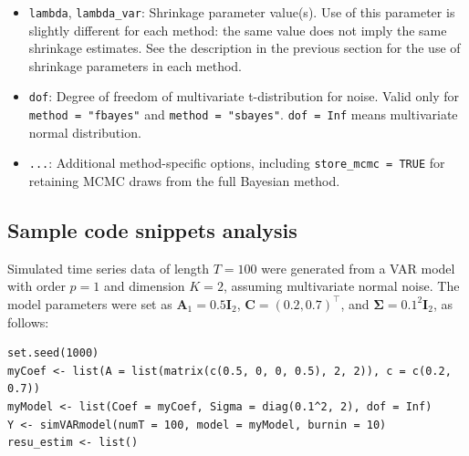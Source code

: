 \begin{itemize}
  \begin{enumerate}
  \def\labelenumi{\arabic{enumi}.}
  \tightlist
  \item
    ``ridge'' - multivariate ridge regression \citep{Hoerl70, Golub79, Ripley18}.
  \item
    ``ns'' - a Stein-type nonparametric shrinkage method \citep{Schafer05b, Rhein07c, Schafer17}.
  \item
    ``fbayes'' - a full Bayesian shrinkage method using noninformative
    priors \citep{Sun04, Ni05}.
  \item
    ``sbayes'' - a semiparametric Bayesian shrinkage method using
    parameterized cross-validation \citep{LeeChoiKim2016}.
  \item
    ``kcv'' - a semiparametric Bayesian shrinkage method using K-fold
    cross-validation \citep{LeeChoiKim2016}.
  \item
    ``ols'' - ordinary least squares estimation, calling \texttt{vars::VAR()}.
  \end{enumerate}
\item
  \texttt{lambda}, \texttt{lambda\_var}: Shrinkage parameter value(s). Use of this
  parameter is slightly different for each method: the same value does
  not imply the same shrinkage estimates. See the description in the
  previous section for the use of shrinkage parameters in each
  method.
\item
  \texttt{dof}: Degree of freedom of multivariate t-distribution for
  noise. Valid only for \texttt{method\ =\ "fbayes"} and
  \texttt{method\ =\ "sbayes"}. \texttt{dof\ =\ Inf} means multivariate normal
  distribution.
\item
  \texttt{...}: Additional method-specific options, including
  \texttt{store\_mcmc\ =\ TRUE} for retaining MCMC draws from the full Bayesian
  method.
\end{itemize}

\subsection{Sample code snippets analysis}\label{sample-code-snippets-analysis}

Simulated time series data of length \(T=100\) were
generated from a VAR model with order \(p=1\) and dimension \(K=2\), assuming
multivariate normal noise. The model parameters were set as
\(\mathbf{A}_1 = 0.5\mathbf{I}_2\),
\(\mathbf{C}=(0.2, 0.7)^\top\), and
\(\mathbf{\Sigma} = 0.1^2\mathbf{I}_2\), as follows:

\begin{verbatim}
set.seed(1000)
myCoef <- list(A = list(matrix(c(0.5, 0, 0, 0.5), 2, 2)), c = c(0.2, 0.7))
myModel <- list(Coef = myCoef, Sigma = diag(0.1^2, 2), dof = Inf)
Y <- simVARmodel(numT = 100, model = myModel, burnin = 10)
resu_estim <- list()
\end{verbatim}


